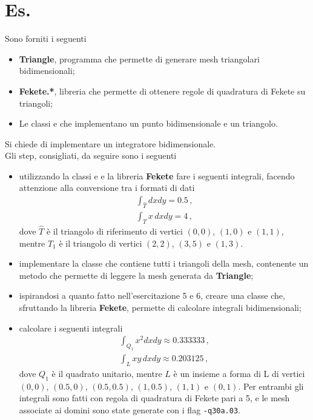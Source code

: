 \section*{Es.}
Sono forniti i seguenti
\begin{itemize}
	\item \textbf{Triangle}, programma che permette di generare mesh triangolari bidimensionali;
	\item \textbf{Fekete.*}, libreria  che permette di ottenere regole di quadratura di Fekete su triangoli;
	\item Le classi  e  che implementano un punto bidimensionale e un triangolo.
\end{itemize}	
Si chiede di implementare un integratore bidimensionale.\\
Gli step, consigliati, da seguire sono i seguenti
\begin{itemize}
	\item utilizzando la classi  e  e la libreria \textbf{Fekete} fare i seguenti integrali, facendo attenzione alla conversione tra i formati di dati
		\begin{align*}
			\int_{\hat{T}}  dx dy = 0.5 \,, \\
			\int_{T} x \, dx dy = 4\,,
		\end{align*}
		dove $\hat{T}$ \`e il triangolo di riferimento di vertici $(0,0)$, $(1,0)$ e $(1,1)$, mentre $T_1$ \`e il triangolo di vertici $(2,2)$, $(3,5)$ e $(1,3)$.
	\item implementare la classe  che contiene tutti i triangoli della mesh, contenente un metodo che permette di leggere la mesh generata da \textbf{Triangle};
	\item ispirandosi a quanto fatto nell'esercitazione 5 e 6, creare una classe  che, sfruttando la libreria \textbf{Fekete}, permette di calcolare integrali bidimensionali;
	\item calcolare i seguenti integrali
		\begin{align*}
			\int_{Q_1} x^2 dx dy \approx 0.333333 \,,\\
			\int_{L} xy \,  dx dy \approx 0.203125\,,
		\end{align*}
		dove $Q_1$ \`e il quadrato unitario, mentre $L$ \`e un insieme a forma di L di vertici $(0,0)$, $(0.5, 0)$, $(0.5, 0.5)$, $(1, 0.5)$, $(1, 1)$ e $(0, 1)$. Per entrambi gli integrali sono fatti con regola di quadratura di Fekete pari a 5, e le mesh associate ai domini sono state generate con i flag \texttt{-q30a.03}.
		
\end{itemize}
